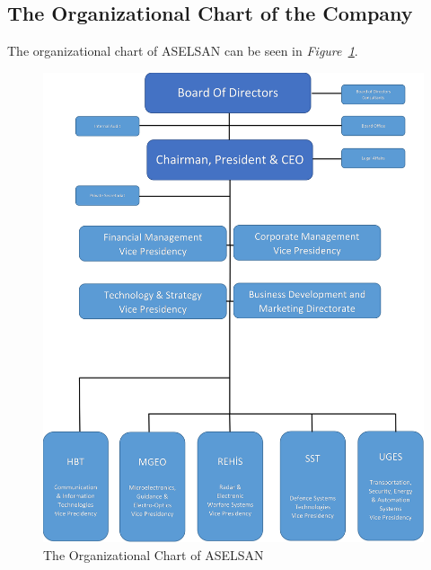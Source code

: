 	
	
\vfill
\subsection{The Organizational Chart of the Company}
\-
\indent
The organizational chart of ASELSAN can be seen in \textit{Figure~\ref{fig:orgc}}.

\begin{figure}[H]
\center
\setlength{\unitlength}{\textwidth} 
\includegraphics[width=0.93\unitlength]{organizasyon4}
\caption{\label{fig:orgc}The Organizational Chart of ASELSAN }
\end{figure}

		

